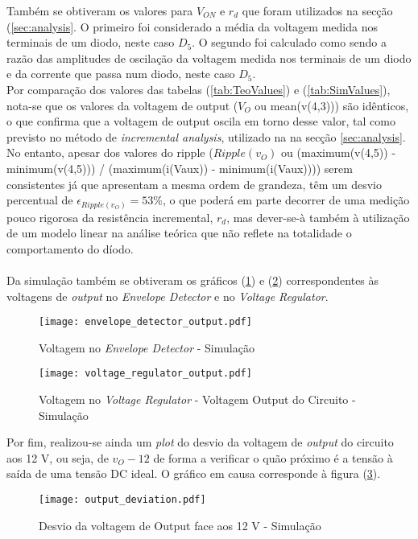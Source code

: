 Também se obtiveram os valores para $V_{ON}$ e $r_d$ que foram utilizados na secção (\ref{sec:analysis}. O primeiro foi considerado a média da voltagem medida
nos terminais de um diodo, neste caso $D_5$. O segundo foi calculado como sendo a razão das amplitudes de oscilação da voltagem medida
nos terminais de um diodo e da corrente que passa num diodo, neste caso $D_5$.
\\
Por comparação dos valores das tabelas (\ref{tab:TeoValues}) e (\ref{tab:SimValues}), nota-se que os valores da voltagem de output ($V_O$ ou mean(v(4,3))) são idênticos,
o que confirma que a voltagem de output oscila em torno desse valor, tal como previsto no método de \emph{incremental analysis}, utilizado na na secção \ref{sec:analysis}.
No entanto, apesar dos valores do ripple ($Ripple(v_O)$ ou (maximum(v(4,5)) - minimum(v(4,5))) / (maximum(i(Vaux)) - minimum(i(Vaux)))) serem consistentes já que apresentam
a mesma ordem de grandeza, têm um desvio percentual de $\epsilon_{Ripple(v_O)} = 53 \%$, o que poderá em parte decorrer de uma medição pouco rigorosa da resistência
incremental, $r_d$, mas dever-se-à também à utilização de um modelo linear na análise teórica que não reflete na totalidade o comportamento do díodo.
\\
\\
Da simulação também se obtiveram os gráficos (\ref{fig:SimEnvelopeDetector}) e (\ref{fig:SimVoltageRegulator}) correspondentes às voltagens de \emph{output}
no \emph{Envelope Detector} e no \emph{Voltage Regulator}.

\begin{figure}[H] \centering
  \texttt{[image: envelope\_detector\_output.pdf]}
  \caption{Voltagem no \emph{Envelope Detector} - Simulação}
  \label{fig:SimEnvelopeDetector}
\end{figure}

\begin{figure}[H] \centering
  \texttt{[image: voltage\_regulator\_output.pdf]}
  \caption{Voltagem no \emph{Voltage Regulator} - Voltagem Output do Circuito - Simulação}
  \label{fig:SimVoltageRegulator}
\end{figure}

Por fim, realizou-se ainda um \emph{plot} do desvio da voltagem de \emph{output} do circuito aos 12 V, ou seja,
de $v_O - 12$ de forma a verificar o quão próximo é a tensão à saída de uma tensão DC ideal. O gráfico em causa corresponde à figura (\ref{fig:SimDeviation}).

\begin{figure}[H] \centering
  \texttt{[image: output\_deviation.pdf]}
  \caption{Desvio da voltagem de Output face aos 12 V - Simulação}
  \label{fig:SimDeviation}
\end{figure}

